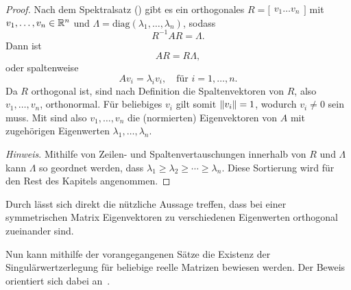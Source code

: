 \begin{proof}
    Nach dem Spektralsatz () gibt es ein orthogonales 
    \(
    R=
    \big[
    \begin{matrix}
        v_1 \dots v_n
    \end{matrix}
    \big]
    \)
    mit
    \(v_1,\ldots,v_n \in \mathbb{R}^{n}\) 
    und 
    \(\Lambda = \text{diag}(\lambda_1,\ldots,\lambda_n)\), sodass
    \begin{equation*}
        R^{-1}AR = \Lambda.
    \end{equation*}
    Dann ist
    \begin{equation*}
        AR = R\Lambda, 
    \end{equation*} 
    oder spaltenweise
    \begin{equation*}
        Av_i = {\lambda}_i v_i, \quad \text{für } i = 1,\ldots,n.
    \end{equation*}
    Da \(R\) orthogonal ist, sind nach Definition die Spaltenvektoren von \(R\), also \(v_1,\ldots,v_n\), orthonormal.
    Für beliebiges \(v_i\) gilt somit \(\lVert v_i\rVert = 1\), wodurch \(v_i \neq 0\) sein muss.
    Mit  sind also \(v_1,\ldots,v_n\) die (normierten) Eigenvektoren von \(A\) mit zugehörigen Eigenwerten \(\lambda_1,\ldots,\lambda_n\).
    
    \textit{Hinweis}. Mithilfe von Zeilen- und Spaltenvertauschungen innerhalb von \(R\) und \(\Lambda\) kann \(\Lambda\) so geordnet werden, dass \(\lambda_1 \geq \lambda_2 \geq \cdots \geq \lambda_n\).
Diese Sortierung wird für den Rest des Kapitels angenommen.
\end{proof}
\begin{remark}
    Durch  lässt sich direkt die nützliche Aussage treffen, dass bei einer symmetrischen Matrix Eigenvektoren zu verschiedenen Eigenwerten orthogonal zueinander sind. 
\end{remark}
Nun kann mithilfe der vorangegangenen Sätze die Existenz der Singulärwertzerlegung für beliebige reelle Matrizen bewiesen werden.
Der Beweis orientiert sich dabei an~\cite{chenLecture5Singular2020}.

